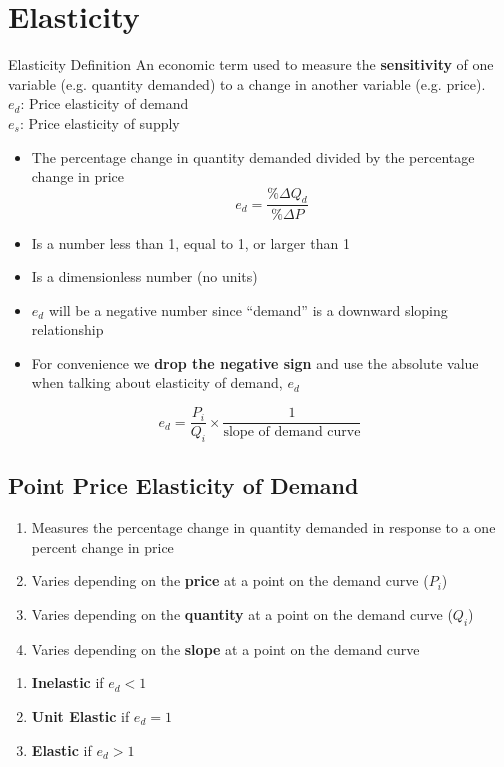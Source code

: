 \section{Elasticity}
\begin{note}{Elasticity Definition}
	An economic term used to measure the \textbf{sensitivity} of one variable (e.g. quantity demanded) to a change in another variable (e.g. price).\\
	$e_d$: Price elasticity of demand\\
	$e_s$: Price elasticity of supply\\
	\begin{itemize}
		\item The percentage change in quantity demanded divided by the percentage change in price
		$$ e_d = \frac{\%\Delta Q_d}{\%\Delta P} $$
		\item Is a number less than 1, equal to 1, or larger than 1
		\item Is a dimensionless number (no units)
	\end{itemize}
\end{note}
\begin{itemize}
	\item $e_d$ will be a negative number since ``demand'' is a downward sloping relationship
	\item For convenience we \textbf{drop the negative sign} and use the absolute value when talking about elasticity of demand, $e_d$
\end{itemize}
$$ e_d = \frac{P_i}{Q_i}\times\frac{1}{\text{slope of demand curve}} $$

\subsection{Point Price Elasticity of Demand}
\begin{enumerate}
	\item Measures the percentage change in quantity demanded in response to a one percent change in price
	\item Varies depending on the \textbf{price} at a point on the demand curve ($P_i$)
	\item Varies depending on the \textbf{quantity} at a point on the demand curve ($Q_i$)
	\item Varies depending on the \textbf{slope} at a point on the demand curve
\end{enumerate}
\begin{enumerate}
	\item \textbf{Inelastic} if $e_d < 1$
	\item \textbf{Unit Elastic} if $e_d = 1$
	\item \textbf{Elastic} if $e_d > 1$
\end{enumerate}

